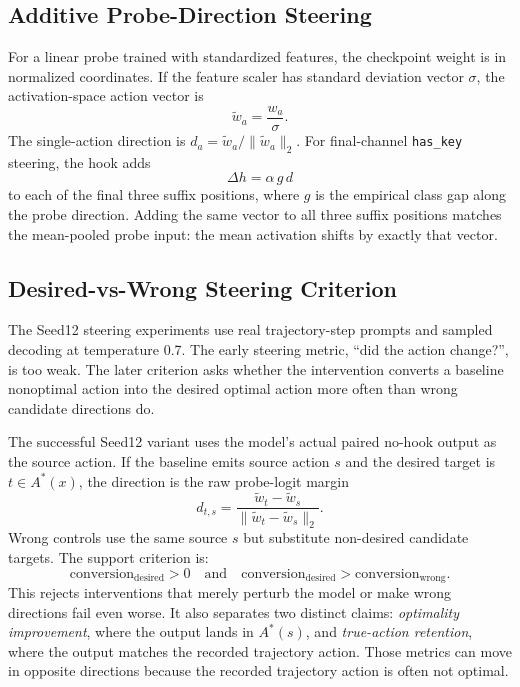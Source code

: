 \documentclass[11pt]{article}
\begin{document}
\subsection{Additive Probe-Direction Steering}

For a linear probe trained with standardized features, the checkpoint weight is in normalized coordinates.
If the feature scaler has standard deviation vector $\sigma$, the activation-space action vector is
\[
  \tilde{w}_a = \frac{w_a}{\sigma}.
\]
The single-action direction is $d_a = \tilde{w}_a / \|\tilde{w}_a\|_2$.
For final-channel \texttt{has\_key} steering, the hook adds
\[
  \Delta h = \alpha \, g \, d
\]
to each of the final three suffix positions, where $g$ is the empirical class gap along the probe direction.
Adding the same vector to all three suffix positions matches the mean-pooled probe input: the mean activation shifts by exactly that vector.

\subsection{Desired-vs-Wrong Steering Criterion}

The Seed12 steering experiments use real trajectory-step prompts and sampled decoding at temperature 0.7.
The early steering metric, ``did the action change?'', is too weak.
The later criterion asks whether the intervention converts a baseline nonoptimal action into the desired optimal action more often than wrong candidate directions do.

The successful Seed12 variant uses the model's actual paired no-hook output as the source action.
If the baseline emits source action $s$ and the desired target is $t \in A^*(x)$, the direction is the raw probe-logit margin
\[
  d_{t,s} = \frac{\tilde{w}_t - \tilde{w}_s}{\|\tilde{w}_t - \tilde{w}_s\|_2}.
\]
Wrong controls use the same source $s$ but substitute non-desired candidate targets.
The support criterion is:
\[
  \mathrm{conversion}_{\mathrm{desired}} > 0
  \quad\text{and}\quad
  \mathrm{conversion}_{\mathrm{desired}} >
  \mathrm{conversion}_{\mathrm{wrong}}.
\]
This rejects interventions that merely perturb the model or make wrong directions fail even worse.
It also separates two distinct claims: \emph{optimality improvement}, where the output lands in $A^*(s)$, and \emph{true-action retention}, where the output matches the recorded trajectory action.
Those metrics can move in opposite directions because the recorded trajectory action is often not optimal.
\end{document}
